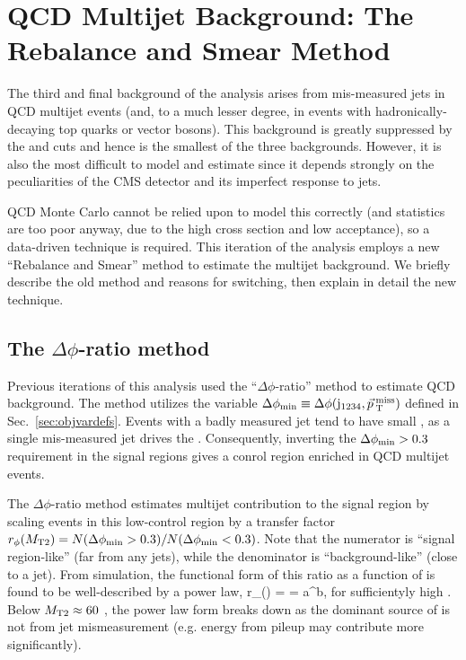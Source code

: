 \chapter{QCD Multijet Background: The Rebalance and Smear Method}
\label{chap:qcd}

The third and final background of the \mttwo analysis arises from mis-measured
jets in QCD multijet events (and, to a much lesser degree, in events with 
hadronically-decaying top quarks or vector bosons). 
This background is greatly suppressed by the
\mttwo and \dphimet cuts and hence is the smallest of the three backgrounds. 
However, it is also the most difficult to model and estimate since it depends
strongly on the peculiarities of the CMS detector and its imperfect response to jets.

QCD Monte Carlo cannot be relied upon to model this correctly (and statistics are too poor
anyway, due to the high cross section and low acceptance), so a data-driven technique is required.
This iteration of the analysis employs a new ``Rebalance and Smear'' method 
to estimate the multijet background. We briefly describe the old method and reasons 
for switching, then explain in detail the new technique.

\section{The $\Delta\phi$-ratio method}

Previous iterations of this analysis \cite{CMS:mt22016,CMS:mt22015} 
used the ``$\Delta\phi$-ratio'' method to estimate QCD background.
The method utilizes the variable $\Delta\phi_{\mathrm{min}} \equiv \Delta\phi(\mathrm{j}_{1234},\vec{p}_{\> \mathrm{T}}^{\> \mathrm{miss}})$ defined in
Sec.~\ref{sec:objvardefs}. Events with a badly measured jet tend to have
small \dpmin, as a single mis-measured jet drives the \vMet. Consequently,
inverting the $\Delta\phi_{\mathrm{min}}>0.3$ requirement in the signal regions gives a 
conrol region enriched in QCD multijet events.

The $\Delta\phi$-ratio method estimates multijet contribution to the 
signal region by scaling events in this low-\dpmin control region
by a transfer factor $r_\phi(M_{\mathrm{T2}}) = N(\Delta\phi_{\mathrm{min}} > 0.3) / N(\Delta\phi_{\mathrm{min}} < 0.3)$.
Note that the numerator is ``signal region-like'' (\vMet far from any jets),
while the denominator is ``background-like'' (\vMet close to a jet).
From simulation, the functional form of this ratio as a function of \mttwo
is found to be well-described by a power law,
\be
r_\phi(\mttwo) =  = a\cdot\mttwo^b,
\ee
for sufficientyly high \mttwo. Below $M_{\mathrm{T2}}\approx60$ \GeV, the power law
form breaks down as the dominant source of \vMet is not from jet mismeasurement
(e.g. energy from pileup may contribute more significantly).

